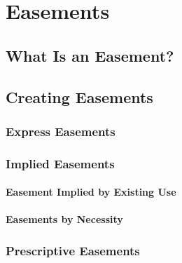 \chapter{Easements}


\section{What Is an Easement?} 




\section{Creating Easements}



\subsection{Express Easements}





\subsection{Implied Easements}



\subsubsection{Easement Implied by Existing Use}




\begin{questions}

\end{questions}


\subsubsection{Easements by Necessity}





\begin{questions}

\end{questions}


\subsection{Prescriptive Easements}

